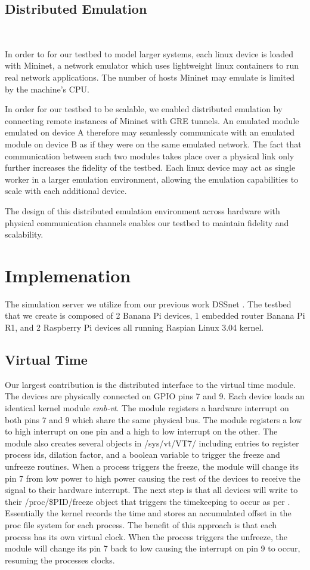 \subsection{Distributed Emulation}
\

In order to for our testbed to model larger systems, each linux device is loaded with Mininet, a network emulator which uses lightweight linux containers to run real network applications. The number of hosts Mininet may emulate is limited by the machine's CPU.

In order for our testbed to be scalable, we enabled distributed emulation by connecting remote instances of Mininet with GRE tunnels. An emulated module emulated on device A therefore may seamlessly communicate with an emulated module on device B as if they were on the same emulated network. The fact that communication between such two modules takes place over a physical link only further increases the fidelity of the testbed. Each linux device may act as single worker in a larger emulation environment, allowing the emulation capabilities to scale with each additional device.

The design of this distributed emulation environment across hardware with physical communication channels enables our testbed to maintain fidelity and scalability. 

\section{Implemenation}

The simulation server we utilize from our previous work DSSnet \cite{Hannon:2016}.
The testbed that we create is composed of 2 Banana Pi devices, 1 embedded router Banana Pi R1, and 2 Raspberry Pi devices all running Raspian Linux 3.04 kernel.

\subsection{Virtual Time}
Our largest contribution is the distributed interface to the virtual time module. The devices are physically connected on GPIO pins 7 and 9. Each device loads an identical kernel module \textit{emb-vt}. The module registers a hardware interrupt on both pins 7 and 9 which share the same physical bus. The module registers a low to high interrupt on one pin and a high to low interrupt on the other. The module also creates several objects in /sys/vt/VT7/ including entries to register process ids, dilation factor, and a boolean variable to trigger the freeze and unfreeze routines.
When a process triggers the freeze, the module will change its pin 7 from low power to high power causing the rest of the devices to receive the signal to their hardware interrupt. The next step is that all devices will write to their /proc/\$PID/freeze object that triggers the timekeeping to occur as per \cite{Yan:VTS:pads15}.
Essentially the kernel records the time and stores an accumulated offset in the proc file system for each process. The benefit of this approach is that each process has its own virtual clock.
When the process triggers the unfreeze, the module will change its pin 7 back to low causing the interrupt on pin 9 to occur, resuming the processes clocks.

